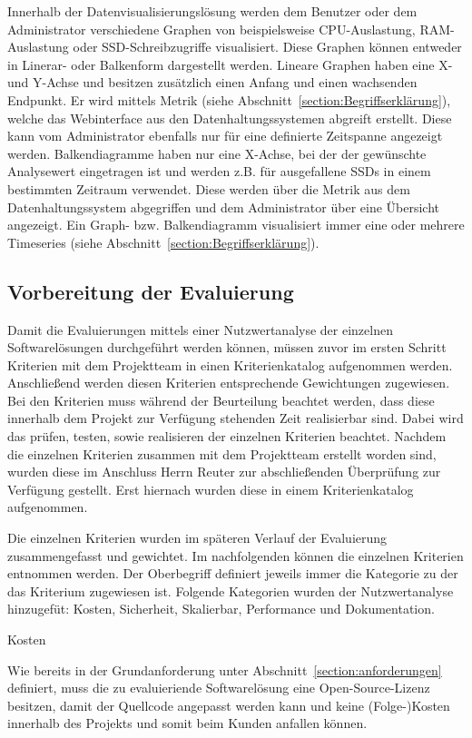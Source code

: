 {Innerhalb der Datenvisualisierungslösung werden dem Benutzer oder dem
Administrator verschiedene Graphen von beispielsweise CPU\hyp{}Auslastung,
RAM-Auslastung oder SSD\hyp{}Schreibzugriffe visualisiert. Diese Graphen können
entweder in Linerar- oder Balkenform dargestellt werden. Lineare Graphen haben
eine X- und Y-Achse und besitzen zusätzlich einen Anfang und einen wachsenden
Endpunkt. Er wird mittels Metrik (siehe
Abschnitt~\ref{section:Begriffserklärung}), welche das Webinterface aus den
Datenhaltungssystemen abgreift erstellt. Diese kann vom Administrator ebenfalls
nur für eine definierte Zeitspanne angezeigt werden.  Balkendiagramme haben nur
eine X-Achse, bei der der gewünschte Analysewert eingetragen ist und werden
z.B. für ausgefallene SSDs in einem bestimmten Zeitraum verwendet. Diese werden
über die Metrik aus dem Datenhaltungssystem abgegriffen und dem Administrator
über eine Übersicht angezeigt. Ein Graph- bzw. Balkendiagramm visualisiert
immer eine oder mehrere Timeseries (siehe
Abschnitt~\ref{section:Begriffserklärung}).

\subsection{Vorbereitung der Evaluierung}
\label{subsec:vorbereiten_der_evaluierung_datenvisualisierung}
Damit die Evaluierungen mittels einer Nutzwertanalyse der einzelnen
Softwarelösungen durchgeführt werden können, müssen zuvor im ersten Schritt
Kriterien mit dem Projektteam in einen Kriterienkatalog aufgenommen werden.
Anschließend werden diesen Kriterien entsprechende Gewichtungen zugewiesen. Bei
den Kriterien muss während der Beurteilung beachtet werden, dass diese
innerhalb dem Projekt zur Verfügung stehenden Zeit realisierbar sind. Dabei
wird das prüfen, testen, sowie realisieren der einzelnen Kriterien beachtet.
Nachdem die einzelnen Kriterien zusammen mit dem Projektteam erstellt worden
sind, wurden diese im Anschluss Herrn Reuter zur abschließenden Überprüfung zur
Verfügung gestellt. Erst hiernach wurden diese in einem Kriterienkatalog
aufgenommen.

Die einzelnen Kriterien wurden im späteren Verlauf der Evaluierung
zusammengefasst und gewichtet. Im nachfolgenden können die einzelnen Kriterien
entnommen werden. Der Oberbegriff definiert jeweils immer die Kategorie zu der
das Kriterium zugewiesen ist. Folgende Kategorien wurden der Nutzwertanalyse
hinzugefüt: Kosten, Sicherheit, Skalierbar, Performance und Dokumentation.

Kosten
\begin{outline}
  \1 Wie bereits in der Grundanforderung unter
  Abschnitt~\ref{section:anforderungen} definiert, muss die zu evaluieriende
  Softwarelösung eine Open\hyp{}Source\hyp{}Lizenz besitzen, damit der Quellcode
  angepasst werden kann und keine (Folge-)Kosten innerhalb des Projekts und
  somit beim Kunden anfallen können.
\end{outline}

}
